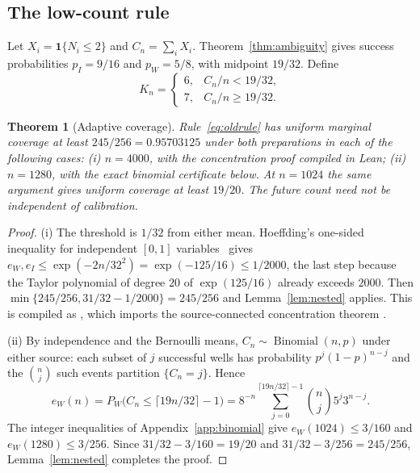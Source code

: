\documentclass[11pt,a4paper]{article}
\theoremstyle{plain}
\newtheorem{theorem}{Theorem}[section]
\theoremstyle{definition}
\theoremstyle{remark}
\newcommand{\ind}{\mathbf 1}
\newcommand{\Bin}{\operatorname{Binomial}}
\begin{document}
\subsection{The low-count rule}
Let $X_i=\ind\{N_i\le2\}$ and $C_n=\sum_iX_i$. Theorem~\ref{thm:ambiguity} gives success probabilities $p_I=9/16$ and $p_W=5/8$, with midpoint $19/32$. Define
\begin{equation}\label{eq:oldrule}
K_n=\begin{cases}6,&C_n/n<19/32,\\7,&C_n/n\ge19/32.\end{cases}
\end{equation}

\begin{theorem}[Adaptive coverage]\label{thm:adaptive}
Rule~\eqref{eq:oldrule} has uniform marginal coverage at least $245/256=0.95703125$ under both preparations in each of the following cases: (i) $n=4000$, with the concentration proof compiled in Lean; (ii) $n=1280$, with the exact binomial certificate below. At $n=1024$ the same argument gives uniform coverage at least $19/20$. The future count need not be independent of calibration.
\end{theorem}

\begin{proof}
(i) The threshold is $1/32$ from either mean. Hoeffding's one-sided inequality for independent $[0,1]$ variables~\citep{hoeffding1963} gives $e_W,e_I\le\exp(-2n/32^2)=\exp(-125/16)\le1/2000$, the last step because the Taylor polynomial of degree $20$ of $\exp(125/16)$ already exceeds $2000$. Then $\min\{245/256,31/32-1/2000\}=245/256$ and Lemma~\ref{lem:nested} applies. This is compiled as , which imports the source-connected concentration theorem .

(ii) By independence and the Bernoulli means, $C_n\sim\Bin(n,p)$ under either source: each subset of $j$ successful wells has probability $p^j(1-p)^{n-j}$ and the $\binom nj$ such events partition $\{C_n=j\}$. Hence
\begin{equation}\label{eq:eWbinom}
e_W(n)=P_W\bigl(C_n\le\lceil19n/32\rceil-1\bigr)=8^{-n}\sum_{j=0}^{\lceil19n/32\rceil-1}\binom nj5^j3^{n-j}.
\end{equation}
The integer inequalities of Appendix~\ref{app:binomial} give $e_W(1024)\le3/160$ and $e_W(1280)\le3/256$. Since $31/32-3/160=19/20$ and $31/32-3/256=245/256$, Lemma~\ref{lem:nested} completes the proof.
\end{proof}
\end{document}
